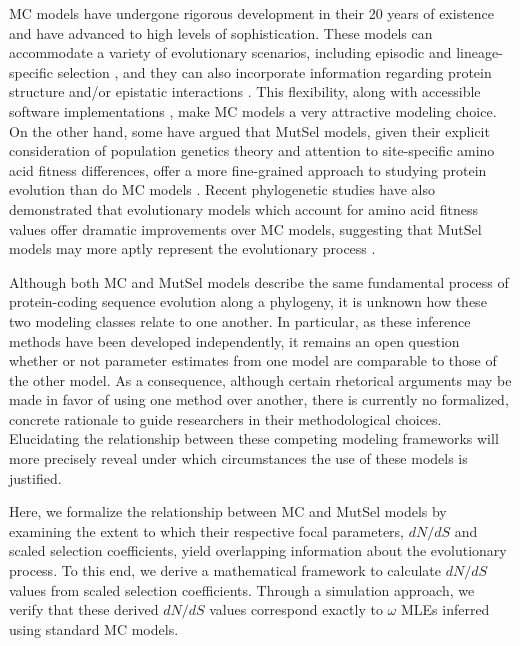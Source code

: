 \documentclass{pnastwo}
\begin{document}
\begin{article}
MC models have undergone rigorous development in their 20 years of existence and have advanced to high levels of sophistication. These models can accommodate a variety of evolutionary scenarios, including episodic \cite{KosakovskyPondetal2011,MEME} and lineage-specific selection \cite{YangNielsen2002,Zhangetal2005,KosakovskyPondFrost2005a}, and they can also incorporate information regarding protein structure and/or epistatic interactions \cite{Robinsonetal2003,Thorneetal2007,Rodrigueetal2009,Scherreretal2012,MeyerWilke2012}. This flexibility, along with accessible software implementations \cite{KosakovskyPondetal2005,Yang2007,Delport2010}, make MC models a very attractive modeling choice. On the other hand, some have argued that MutSel models, given their explicit consideration of population genetics theory and attention to site-specific amino acid fitness differences, offer a more fine-grained approach to studying protein evolution than do MC models \cite{HalpernBruno1998,Rodrigueetal2010,Tamurietal2012,Thorne2012}. Recent phylogenetic studies have also demonstrated that evolutionary models which account for amino acid fitness values offer dramatic improvements over MC models, suggesting that MutSel models may more aptly represent the evolutionary process \cite{Bloom2014a, Bloom2014b}. 
		
Although both MC and MutSel models describe the same fundamental process of protein-coding sequence evolution along a phylogeny, it is unknown how these two modeling classes relate to one another. In particular, as these inference methods have been developed independently, it remains an open question whether or not parameter estimates from one model are comparable to those of the other model. As a consequence, although certain rhetorical arguments may be made in favor of using one method over another, there is currently no formalized, concrete rationale to guide researchers in their methodological choices. Elucidating the relationship between these competing modeling frameworks will more precisely reveal under which circumstances the use of these models is justified.
		
Here, we formalize the relationship between MC and MutSel models by examining the extent to which their respective focal parameters, $dN/dS$ and scaled selection coefficients, yield overlapping information about the evolutionary process. To this end, we derive a mathematical framework to calculate $dN/dS$ values from scaled selection coefficients. Through a simulation approach, we verify that these derived $dN/dS$ values correspond exactly to $\omega$ MLEs inferred using standard MC models. 
		

\end{article}
\end{document}
